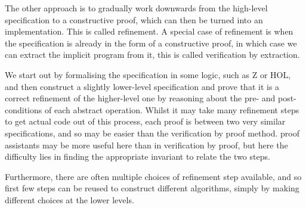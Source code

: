 The other approach is to gradually work downwards from the high-level
specification to a constructive proof, which can then be turned into
an implementation. This is called refinement. A special case of
refinement is when the specification is already in the form of a
constructive proof, in which case we can extract the implicit program
from it, this is called \gls{verification by extraction}.

We start out by formalising the specification in some logic, such as Z
or HOL, and then construct a slightly lower-level specification and
prove that it is a correct refinement of the higher-level one by
reasoning about the pre- and post-conditions of each abstract
operation. Whilst it may take many refinement steps to get actual code
out of this process, each proof is between two very similar
\glspl{specification}, and so may be easier than the verification by
proof method. \Glspl{proof assistant} may be more useful here than in
verification by proof, but here the difficulty lies in finding the
appropriate invariant to relate the two steps.

Furthermore, there are often multiple choices of refinement step
available, and so first few steps can be reused to construct different
algorithms, simply by making different choices at the lower levels.

